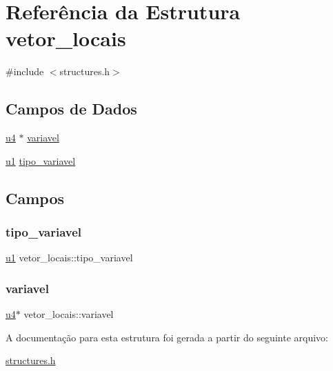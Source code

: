\hypertarget{structvetor__locais}{}\section{Referência da Estrutura vetor\+\_\+locais}
\label{structvetor__locais}


{\ttfamily \#include $<$structures.\+h$>$}

\subsection*{Campos de Dados}
\begin{DoxyCompactItemize}
\item 
\hyperlink{lista__operandos_8h_ae5be1f726785414dd1b77d60df074c9d}{u4} $\ast$ \hyperlink{structvetor__locais_a474212032f52e10c83331da9efdbf0e8}{variavel}
\item 
\hyperlink{lista__operandos_8h_ad9f4cdb6757615aae2fad89dab3c5470}{u1} \hyperlink{structvetor__locais_a8f30386b3b7757677d00d6e14e535278}{tipo\+\_\+variavel}
\end{DoxyCompactItemize}


\subsection{Campos}
\mbox{\label{structvetor__locais_a8f30386b3b7757677d00d6e14e535278}} 
\subsubsection{\texorpdfstring{tipo\+\_\+variavel}{tipo\_variavel}}
{\footnotesize\ttfamily \hyperlink{lista__operandos_8h_ad9f4cdb6757615aae2fad89dab3c5470}{u1} vetor\+\_\+locais\+::tipo\+\_\+variavel}

\mbox{\label{structvetor__locais_a474212032f52e10c83331da9efdbf0e8}} 
\subsubsection{\texorpdfstring{variavel}{variavel}}
{\footnotesize\ttfamily \hyperlink{lista__operandos_8h_ae5be1f726785414dd1b77d60df074c9d}{u4}$\ast$ vetor\+\_\+locais\+::variavel}



A documentação para esta estrutura foi gerada a partir do seguinte arquivo\+:\begin{DoxyCompactItemize}
\item 
\hyperlink{structures_8h}{structures.\+h}\end{DoxyCompactItemize}
